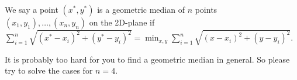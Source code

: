 We say a point $(x^*,y^*)$ is a geometric median of $n$ points $(x_1,y_1),\ldots,(x_n,y_n)$ on the 2D-plane
if $\sum_{i=1}^{n}\sqrt{(x^*-x_i)^2+(y^*-y_i)^2}=\min_{x,y}\sum_{i=1}^{n}\sqrt{(x-x_i)^2+(y-y_i)^2}$.

It is probably too hard for you to find a geometric median in general. So please try to solve the cases for $n=4$.
